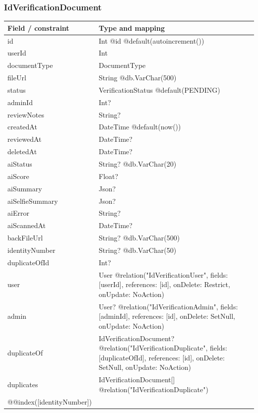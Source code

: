\subsubsection{IdVerificationDocument}
\begin{longtable}{|L{3.3cm}|L{10.8cm}|}\hline
Field / constraint & Type and mapping \\ \hline
id & Int @id @default(autoincrement()) \\ \hline
userId & Int \\ \hline
documentType & DocumentType \\ \hline
fileUrl & String @db.VarChar(500) \\ \hline
status & VerificationStatus @default(PENDING) \\ \hline
adminId & Int? \\ \hline
reviewNotes & String? \\ \hline
createdAt & DateTime @default(now()) \\ \hline
reviewedAt & DateTime? \\ \hline
deletedAt & DateTime? \\ \hline
aiStatus & String? @db.VarChar(20) \\ \hline
aiScore & Float? \\ \hline
aiSummary & Json? \\ \hline
aiSelfieSummary & Json? \\ \hline
aiError & String? \\ \hline
aiScannedAt & DateTime? \\ \hline
backFileUrl & String? @db.VarChar(500) \\ \hline
identityNumber & String? @db.VarChar(50) \\ \hline
duplicateOfId & Int? \\ \hline
user & User @relation("IdVerificationUser", fields: [userId], references: [id], onDelete: Restrict, onUpdate: NoAction) \\ \hline
admin & User? @relation("IdVerificationAdmin", fields: [adminId], references: [id], onDelete: SetNull, onUpdate: NoAction) \\ \hline
duplicateOf & IdVerificationDocument? @relation("IdVerificationDuplicate", fields: [duplicateOfId], references: [id], onDelete: SetNull, onUpdate: NoAction) \\ \hline
duplicates & IdVerificationDocument[] @relation("IdVerificationDuplicate") \\ \hline
@@index([identityNumber]) &  \\ \hline
\end{longtable}

